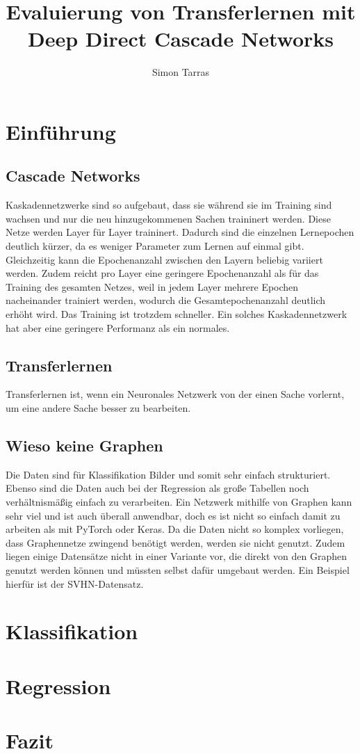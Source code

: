 \documentclass[ngerman]{report}
\title{Evaluierung von Transferlernen mit Deep Direct Cascade Networks}
\author{Simon Tarras}
\begin{document}
    \maketitle
    \tableofcontents
    \chapter{Einführung}
        \section{Cascade Networks}
        Kaskadennetzwerke sind so aufgebaut, dass sie während sie 
        im Training sind wachsen und nur die neu hinzugekommenen 
        Sachen traininert werden. \cite{cascor}
        Diese Netze werden Layer für Layer traininert. Dadurch sind die 
        einzelnen Lernepochen deutlich kürzer, da es weniger Parameter 
        zum Lernen auf einmal gibt. Gleichzeitig kann die Epochenanzahl 
        zwischen den Layern beliebig variiert werden. Zudem reicht pro 
        Layer eine geringere Epochenanzahl als für das Training des 
        gesamten Netzes, weil in jedem Layer mehrere Epochen nacheinander 
        trainiert werden, wodurch die Gesamtepochenanzahl deutlich erhöht wird. 
        Das Training ist trotzdem schneller. Ein solches Kaskadennetzwerk 
        hat aber eine geringere Performanz als ein normales. 
        \section{Transferlernen}
        Transferlernen ist, wenn ein Neuronales Netzwerk von der 
        einen Sache vorlernt, um eine andere Sache besser zu 
        bearbeiten.
        \section{Wieso keine Graphen}
        Die Daten sind für Klassifikation Bilder und somit sehr einfach strukturiert. 
        Ebenso sind die Daten auch bei der Regression als große Tabellen noch 
        verhältnismäßig einfach zu verarbeiten. 
        Ein Netzwerk mithilfe von Graphen kann sehr viel und ist auch überall anwendbar, 
        doch es ist nicht so einfach damit zu arbeiten als mit PyTorch oder Keras.
        Da die Daten nicht so komplex vorliegen, dass Graphennetze zwingend benötigt 
        werden, werden sie nicht genutzt. Zudem liegen einige Datensätze nicht in einer 
        Variante vor, die direkt von den Graphen genutzt werden können und müssten 
        selbst dafür umgebaut werden. Ein Beispiel hierfür ist 
        der SVHN-Datensatz.
    \chapter{Klassifikation}
    
    
    \chapter{Regression}
    

    \chapter{Fazit}
    \printbibliography
\end{document}
